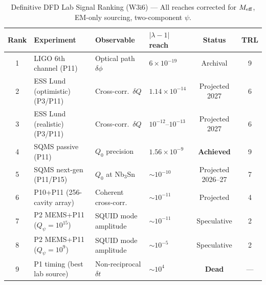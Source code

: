 \documentclass[11pt]{article}
\newcommand{\lam}{\lambda}
\newcommand{\Meff}{M_{\rm eff}}
\newcommand{\ee}[1]{\times 10^{#1}}
\newcommand{\Qpsi}{Q_\psi}
\newcommand{\lbone}{|\lam - 1|}
\theoremstyle{definition}
\theoremstyle{remark}
\begin{document}
\begin{table}[H]
\centering
\caption{Definitive DFD Lab Signal Ranking (W3i6) ---
All reaches corrected for $\Meff$, EM-only sourcing, two-component
$\psi$.}
\label{tab:definitive_ranking}
\renewcommand{\arraystretch}{1.25}
\begin{tabular}{@{}clllcc@{}}
\toprule
\textbf{Rank} & \textbf{Experiment} & \textbf{Observable} &
  \textbf{$\lbone$ reach} & \textbf{Status} & \textbf{TRL} \\
\midrule
\rowcolor{rowhi}
1 & LIGO 6th channel (P11) & Optical path $\delta\phi$
  & $6\ee{-19}$ & Archival & 9 \\
\rowcolor{rowhi}
2 & ESS Lund (optimistic) (P3/P11) & Cross-corr.\ $\delta Q$
  & $1.14\ee{-14}$ & Projected 2027 & 6 \\
\rowcolor{rowhi}
3 & ESS Lund (realistic) (P3/P11) & Cross-corr.\ $\delta Q$
  & $10^{-12}$--$10^{-13}$ & Projected 2027 & 6 \\
\rowcolor{rowhi}
4 & SQMS passive (P11) & $Q_0$ precision
  & $1.56\ee{-9}$ & \textbf{Achieved} & 9 \\
\rowcolor{rowmed}
5 & SQMS next-gen (P11/P15) & $Q_0$ at Nb$_3$Sn
  & $\sim 10^{-10}$ & Projected 2026--27 & 7 \\
\rowcolor{rowmed}
6 & P10+P11 (256-cavity array) & Coherent cross-corr.
  & $\sim 10^{-11}$ & Projected & 4 \\
\rowcolor{rowlo}
7 & P2 MEMS+P11 ($\Qpsi=10^{15}$) & SQUID mode amplitude
  & $\sim 10^{-11}$ & Speculative & 2 \\
\rowcolor{rowlo}
8 & P2 MEMS+P11 ($\Qpsi=10^{9}$) & SQUID mode amplitude
  & $\sim 10^{-5}$ & Speculative & 2 \\
\rowcolor{rowlo}
9 & P1 timing (best lab source) & Non-reciprocal $\delta t$
  & $\sim 10^{4}$ & \textbf{Dead} & --- \\
\bottomrule
\end{tabular}
\end{table}
\end{document}

